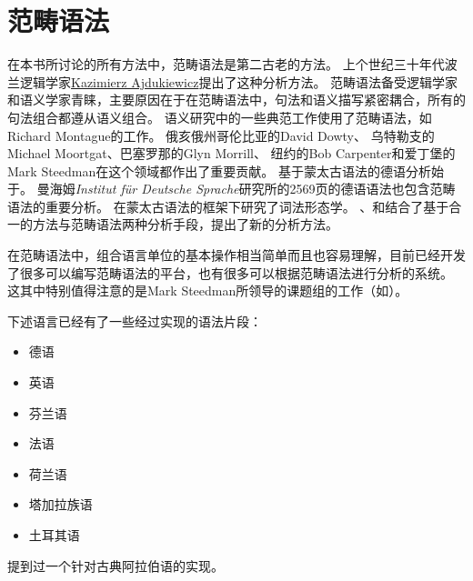 
\chapter{范畴语法}
\label{Kapitel-CG}\label{chap-CG}

在本书所讨论的所有方法中，范畴语法是第二古老的方法。
上个世纪三十年代波兰逻辑学家\href{http://en.wikipedia.org/wiki/Kazimierz_Ajdukiewicz}{Kazimierz Ajdukiewicz}提出了这种分析方法\citep{Ajdukiewicz35a-u}。
范畴语法备受逻辑学家和语义学家青睐，主要原因在于在范畴语法中，句法和语义描写紧密耦合，所有的句法组合都遵从语义组合。
语义研究中的一些典范工作使用了范畴语法，如Richard Montague\citeyearpar{Montague74a-u}的工作。
俄亥俄州哥伦比亚的David Dowty\citeyearpar{Dowty79a}、 
乌特勒支的Michael Moortgat\citeyearpar{Moortgat89a-u}、巴塞罗那的Glyn Morrill\citeyearpar{Morrill94a-u}、
纽约的Bob Carpenter\citeyearpar{Carpenter98a-u}和爱丁堡的Mark Steedman\citeyearpar{Steedman91a,Steedman97a,Steedman2000a-u}在这个领域都作出了重要贡献。
基于蒙太古语法的德语分析始于。
曼海姆\emph{Institut für Deutsche Sprache}研究所的2569页的德语语法\citep*{IDS97-not-crossreferenced}也包含范畴语法的重要分析。
\citet{Fanselow81a-u}在蒙太古语法的框架下研究了词法形态学。
\citet{Uszkoreit86d}、\citet{Karttunen86a,Karttunen89a-u}和\citet*{CKZ88a}结合了基于合一的方法与范畴语法两种分析手段，提出了新的分析方法。

在范畴语法中，组合语言单位的基本操作相当简单而且也容易理解，目前已经开发了很多可以编写范畴语法的平台，也有很多可以根据范畴语法进行分析的系统\citep*{YK90a-u,Carpenter1994a-u,BvN94a-u,Llore1995a-u,Koenig99a-u,Moot2002a-u,WB2003a-u,BCPW2007a,Morrill2012a}。
这其中特别值得注意的是Mark Steedman所领导的课题组的工作（如\citealp*{CHS2002a-u,CC2007a-u}）。

下述语言已经有了一些经过实现的语法片段：
\begin{itemize}
\item 德语\citep*{Uszkoreit86d,Koenig99a-u,VHE2003a,VTBS2011a}
\item 英语 \citep{Villavicencio2002a,Baldridge2002a-u,Beavers2002a-u,Beavers2004a-u}
\item 芬兰语 \citep{Karttunen89a-u}
\item 法语 \citep*{BBCG87a-u}
\item 荷兰语 \citep{BvN94a-u,Baldridge2002a-u}
\item 塔加拉族语 \citep{Baldridge2002a-u}
\item 土耳其语 \citep{Hoffmann95a-u,Baldridge2002a-u}
\end{itemize}
\citet*[]{BCPW2007a}提到过一个针对古典阿拉伯语的实现。

